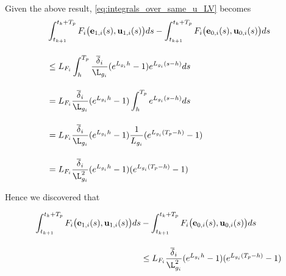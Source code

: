Given the above result, \eqref{eq:integrals_over_same_u_LV} becomes
\begin{align}
  &\int_{t_{k+1}}^{t_k + T_p} F_i \big(\vect{e}_{1,i}(s), \vect{u}_{1,i} (s)\big) d s
    - \int_{t_{k+1}}^{t_k + T_p} F_i \big(\vect{e}_{0,i}(s), \vect{u}_{0,i} (s)\big) d s \\[2.5ex]
  & \leq L_{F_i}\int_{h}^{T_p} \dfrac{\overline{\delta}_i}{\L_{g_i}} (e^{L_{g_i}h} - 1) e^{L_{g_i}(s-h)} d s \\[2.5ex]
  &=  L_{F_i} \dfrac{\overline{\delta}_i}{\L_{g_i}} (e^{L_{g_i}h} - 1) \int_{h}^{T_p} e^{L_{g_i}(s-h)} d s \\[2.5ex]
  & = L_{F_i} \dfrac{\overline{\delta}_i}{\L_{g_i}} (e^{L_{g_i} h} - 1) \dfrac{1}{L_{g_i}}(e^{L_{g_i}(T_p-h)} - 1) \\[2.5ex]
  & = L_{F_i} \dfrac{\overline{\delta}_i}{\L_{g_i}^2} (e^{L_{g_i} h} - 1) (e^{L_{g_i}(T_p-h)} - 1)
\end{align}


Hence we discovered that
\begin{bw_box}
\begin{align}
  \int_{t_{k+1}}^{t_k + T_p} F_i \big(\vect{e}_{1,i}(s), \vect{u}_{1,i} (s)\big) d s
  &- \int_{t_{k+1}}^{t_k + T_p} F_i \big(\vect{e}_{0,i}(s), \vect{u}_{0,i} (s)\big) d s \\[2.5ex]
  & \leq L_{F_i} \dfrac{\overline{\delta}_i}{\L_{g_i}^2} (e^{L_{g_i} h} - 1) (e^{L_{g_i}(T_p-h)} - 1)
\label{eq:end_result_two_integrals}
\end{align}
\end{bw_box}

